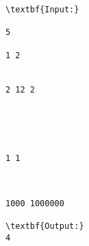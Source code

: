 \begin{verbatim}
\textbf{Input:}

5

1 2


2 12 2





1 1



1000 1000000

\textbf{Output:}
4
\end{verbatim}